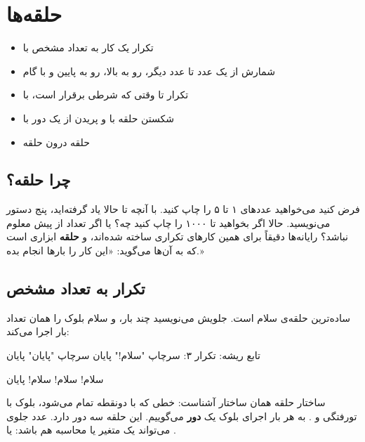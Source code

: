 \chapter{حلقه‌ها}\label{ch:loops}

\begin{goals}
\begin{itemize}
  \item تکرار یک کار به تعداد مشخص با 
  \item شمارش از یک عدد تا عدد دیگر، رو به بالا، رو به پایین و با گام
  \item تکرار تا وقتی که شرطی برقرار است، با 
  \item شکستن حلقه با  و پریدن از یک دور با 
  \item حلقه درون حلقه
\end{itemize}
\end{goals}

\section{چرا حلقه؟}

فرض کنید می‌خواهید عددهای ۱ تا ۵ را چاپ کنید. با آنچه تا حالا یاد
گرفته‌اید، پنج دستور  می‌نویسید. حالا اگر بخواهید تا ۱۰۰۰ را چاپ
کنید چه؟ یا اگر تعداد از پیش معلوم نباشد؟ رایانه‌ها دقیقاً برای همین
کارهای تکراری ساخته شده‌اند، و \textbf{حلقه} ابزاری است که به آن‌ها
می‌گوید: «این کار را بارها انجام بده.»

\section{تکرار به تعداد مشخص}

ساده‌ترین حلقه‌ی سلام  است. جلویش می‌نویسید چند بار، و سلام بلوک
را همان تعداد بار اجرا می‌کند:

\begin{salamfa}
تابع ریشه:
    تکرار ۳:
        سرچاپ "سلام!"
    پایان
    سرچاپ "پایان"
پایان
\end{salamfa}

\begin{outputfa}
سلام!
سلام!
سلام!
پایان
\end{outputfa}

ساختار حلقه همان ساختار آشناست: خطی که با دونقطه تمام می‌شود، بلوک با
تورفتگی و . به هر بار اجرای بلوک یک \textbf{دور} می‌گوییم. این
حلقه سه دور دارد. عدد جلوی  می‌تواند یک متغیر یا محاسبه هم
باشد:  یا .

